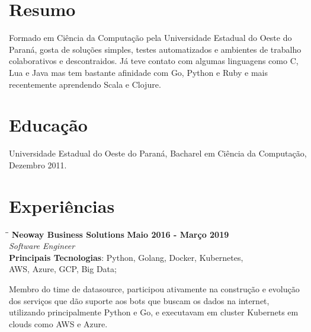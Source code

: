 \documentclass[margin]{res}
\begin{document}

\address{Florianópolis, SC \\ cadicallegari@gmail.com \\ Telefone: (48) 99826 4067}


\begin{resume}


\section{Resumo} Formado em Ciência da Computação pela Universidade Estadual do Oeste do Paraná, gosta de soluções simples, testes automatizados e ambientes de trabalho colaborativos e descontraidos.
Já teve contato com algumas linguagens como C, Lua e Java mas tem bastante afinidade com Go, Python e Ruby e mais recentemente aprendendo Scala e Clojure.


\section{Educação}	Universidade Estadual do Oeste do Paraná, Bacharel em Ciência da Computação, Dezembro 2011.

\section{Experiências}

\vspace{-0.1in}
   \begin{tabbing}
   \hspace{2.3in}\= \hspace{1.7in}\= \kill %
    \textbf{Neoway Business Solutions}    \>\>\textbf{Maio 2016 - Março 2019}\\
    \textit{Software Engineer}\\
    \textbf{Principais Tecnologias}: Python, Golang, Docker, Kubernetes,\\
    AWS, Azure, GCP, Big Data;
   \end{tabbing}\vspace{-20pt}      %
    \vspace{2mm}
    
    Membro do time de datasource, participou ativamente na construção e evolução dos serviços que dão suporte aos bots que buscam os dados na internet, utilizando principalmente Python e Go, e executavam em cluster Kubernets em clouds como AWS e Azure.


\end{resume}
\end{document}
